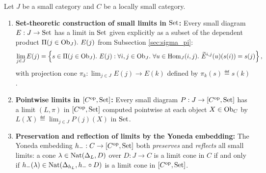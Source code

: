 \documentclass[10pt,a4paper]{article}
\begin{document}
\begin{theorem}\label{thm:yoneda_limits}
Let $J$ be a small category and $C$ be a locally small category.
\begin{enumerate}
\item \textbf{Set-theoretic construction of small limits in ${\textrm{Set}}$:} Every small diagram $E : J \to {\textrm{Set}}$ has a limit in ${\textrm{Set}}$ given explicitly as a subset of the dependent product $\Pi(j \in \Ob_J).\ E(j)$ from Subsection \ref{sec:sigma_pi}:
$$\lim_{j \in J} E(j) = \left\{ s \in \Pi(j \in \Ob_J).\ E(j) : \forall i, j \in \Ob_J.\ \forall u \in \Hom_J(i, j).\ \widetilde{E}^{i,j}(u)(s(i)) = s(j) \right\},$$
with projection cone $\pi_k : \lim_{j \in J} E(j) \to E(k)$ defined by $\pi_k(s) \eqdef s(k)$.
\item \textbf{Pointwise limits in $[C^{\textrm{op}}, {\textrm{Set}}]$:} Every small diagram $P : J \to [C^{\textrm{op}}, {\textrm{Set}}]$ has a limit $(L, \pi)$ in $[C^{\textrm{op}}, {\textrm{Set}}]$ computed pointwise at each object $X \in {\textrm{Ob}}_C$ by $L(X) \eqdef \lim_{j \in J} P(j)(X)$ in ${\textrm{Set}}$.
\item \textbf{Preservation and reflection of limits by the Yoneda embedding:} The Yoneda embedding $h_- : C \to [C^{\textrm{op}}, {\textrm{Set}}]$ both \emph{preserves} and \emph{reflects} all small limits: a cone $\lambda \in {\textrm{Nat}}(\Delta_L, D)$ over $D : J \to C$ is a limit cone in $C$ if and only if $h_-(\lambda) \in {\textrm{Nat}}(\Delta_{h_L}, h_- \circ D)$ is a limit cone in $[C^{\textrm{op}}, {\textrm{Set}}]$.
\end{enumerate}
\end{theorem}
\myprf
\end{document}
